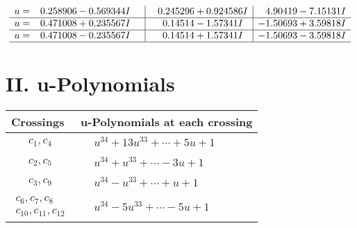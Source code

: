 \documentclass[1p]{elsarticle_modified}
\theoremstyle{definition}
\begin{document}
$$\begin{array}{c|c|c}
\begin{aligned}
u &= \phantom{-}0.258906 - 0.569344 I\end{aligned}
 & \phantom{-}0.245296 + 0.924586 I & \phantom{-}4.90419 - 7.15131 I \\ \hline\begin{aligned}
u &= \phantom{-}0.471008 + 0.235567 I\end{aligned}
 & \phantom{-}0.14514 - 1.57341 I & -1.50693 + 3.59818 I \\ \hline\begin{aligned}
u &= \phantom{-}0.471008 - 0.235567 I\end{aligned}
 & \phantom{-}0.14514 + 1.57341 I & -1.50693 - 3.59818 I\\
 \hline 
 \end{array}$$\newpage
\newpage\renewcommand{\arraystretch}{1}
\centering \section*{ II. u-Polynomials}
\begin{tabular}{m{50pt}|m{274pt}}
Crossings & \hspace{64pt}u-Polynomials at each crossing \\
\hline $$\begin{aligned}c_{1},c_{4}\end{aligned}$$&$\begin{aligned}
&u^{34}+13 u^{33}+\cdots+5 u+1
\end{aligned}$\\
\hline $$\begin{aligned}c_{2},c_{5}\end{aligned}$$&$\begin{aligned}
&u^{34}+u^{33}+\cdots-3 u+1
\end{aligned}$\\
\hline $$\begin{aligned}c_{3},c_{9}\end{aligned}$$&$\begin{aligned}
&u^{34}- u^{33}+\cdots+u+1
\end{aligned}$\\
\hline $$\begin{aligned}c_{6},c_{7},c_{8}\\c_{10},c_{11},c_{12}\end{aligned}$$&$\begin{aligned}
&u^{34}-5 u^{33}+\cdots-5 u+1
\end{aligned}$\\
\hline
\end{tabular}\newpage\renewcommand{\arraystretch}{1}
\end{document}
